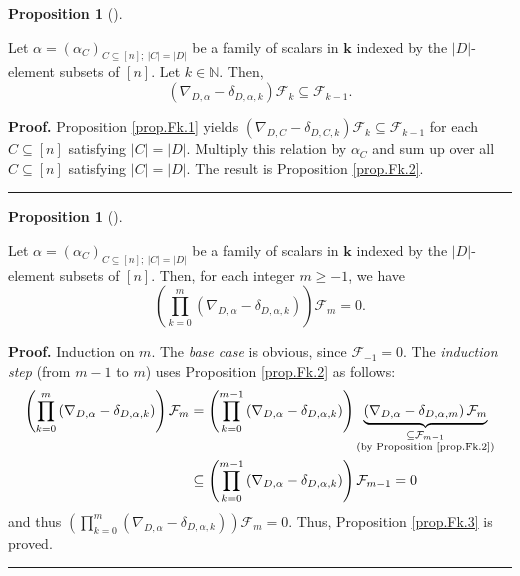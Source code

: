 \documentclass[numbers=enddot,12pt,final,onecolumn,notitlepage]{scrartcl}%
\numberwithin{exer}{subsection}
\theoremstyle{definition}
\newtheorem{prop}[theo]{Proposition}
\newenvironment{proposition}[1][]
{\begin{prop}[#1]\begin{leftbar}}
{\end{leftbar}\end{prop}}
\newenvironment{proof}[1][Proof]{\noindent\textbf{#1.} }{\ \rule{0.5em}{0.5em}}
\let\prodnonlimits\prod
\renewcommand{\prod}{\prodnonlimits\limits}
\begin{document}
\begin{proposition}
\label{prop.Fk.2}Let $\alpha=\left(  \alpha_{C}\right)  _{C\subseteq\left[
n\right]  ;\ \left\vert C\right\vert =\left\vert D\right\vert }$ be a family
of scalars in $\mathbf{k}$ indexed by the $\left\vert D\right\vert $-element
subsets of $\left[  n\right]  $. Let $k\in\mathbb{N}$. Then,%
\[
\left(  \nabla_{D,\alpha}-\delta_{D,\alpha,k}\right)  \mathcal{F}_{k}%
\subseteq\mathcal{F}_{k-1}.
\]

\end{proposition}

\begin{proof}
Proposition \ref{prop.Fk.1} yields $\left(  \nabla_{D,C}-\delta_{D,C,k}%
\right)  \mathcal{F}_{k}\subseteq\mathcal{F}_{k-1}$ for each $C\subseteq
\left[  n\right]  $ satisfying $\left\vert C\right\vert =\left\vert
D\right\vert $. Multiply this relation by $\alpha_{C}$ and sum up over all
$C\subseteq\left[  n\right]  $ satisfying $\left\vert C\right\vert =\left\vert
D\right\vert $. The result is Proposition \ref{prop.Fk.2}.
\end{proof}

\begin{proposition}
\label{prop.Fk.3}Let $\alpha=\left(  \alpha_{C}\right)  _{C\subseteq\left[
n\right]  ;\ \left\vert C\right\vert =\left\vert D\right\vert }$ be a family
of scalars in $\mathbf{k}$ indexed by the $\left\vert D\right\vert $-element
subsets of $\left[  n\right]  $. Then, for each integer $m\geq-1$, we have%
\[
\left(  \prod_{k=0}^{m}\left(  \nabla_{D,\alpha}-\delta_{D,\alpha,k}\right)
\right)  \mathcal{F}_{m}=0.
\]

\end{proposition}

\begin{proof}
Induction on $m$. The \textit{base case} is obvious, since $\mathcal{F}%
_{-1}=0$. The \textit{induction step} (from $m-1$ to $m$) uses Proposition
\ref{prop.Fk.2} as follows:%
\begin{align*}
\left(  \prod_{k=0}^{m}\left(  \nabla_{D,\alpha}-\delta_{D,\alpha,k}\right)
\right)  \mathcal{F}_{m}  &  =\left(  \prod_{k=0}^{m-1}\left(  \nabla
_{D,\alpha}-\delta_{D,\alpha,k}\right)  \right)  \underbrace{\left(
\nabla_{D,\alpha}-\delta_{D,\alpha,m}\right)  \mathcal{F}_{m}}%
_{\substack{\subseteq\mathcal{F}_{m-1}\\\text{(by Proposition \ref{prop.Fk.2}%
)}}}\\
&  \subseteq\left(  \prod_{k=0}^{m-1}\left(  \nabla_{D,\alpha}-\delta
_{D,\alpha,k}\right)  \right)  \mathcal{F}_{m-1}=0
\end{align*}
and thus $\left(  \prod_{k=0}^{m}\left(  \nabla_{D,\alpha}-\delta_{D,\alpha
,k}\right)  \right)  \mathcal{F}_{m}=0$. Thus, Proposition \ref{prop.Fk.3} is proved.
\end{proof}
\end{document}
